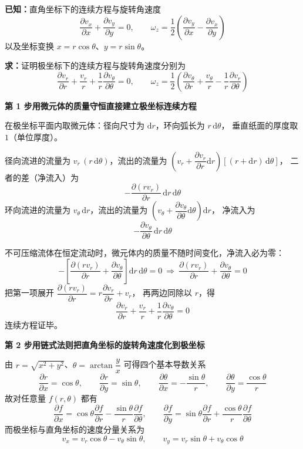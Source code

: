 \begin{jie}
\textbf{已知：}直角坐标下的连续方程与旋转角速度
\[ \frac{\partial v_x}{\partial x}+\frac{\partial v_y}{\partial y}=0,\qquad
   \omega_z=\frac{1}{2}\left(\frac{\partial v_y}{\partial x}-\frac{\partial v_x}{\partial y}\right) \]
以及坐标变换 $x=r\cos\theta$、$y=r\sin\theta$。

\textbf{求：}证明极坐标下的连续方程与旋转角速度分别为
\[ \frac{\partial v_r}{\partial r}+\frac{v_r}{r}+\frac{1}{r}\frac{\partial v_\theta}{\partial\theta}=0,\qquad
   \omega_z=\frac{1}{2}\left(\frac{\partial v_\theta}{\partial r}+\frac{v_\theta}{r}-\frac{1}{r}\frac{\partial v_r}{\partial\theta}\right) \]

\textbf{第 1 步\quad 用微元体的质量守恒直接建立极坐标连续方程}

在极坐标平面内取微元体：径向尺寸为 $\mathrm{d}r$，环向弧长为 $r\,\mathrm{d}\theta$，
垂直纸面的厚度取 $1$（单位厚度）。

径向流进的流量为 $v_r\,(r\,\mathrm{d}\theta)$，流出的流量为
$\left(v_r+\dfrac{\partial v_r}{\partial r}\mathrm{d}r\right)\left[(r+\mathrm{d}r)\,\mathrm{d}\theta\right]$，
二者的差（净流入）为
\[ -\frac{\partial(rv_r)}{\partial r}\,\mathrm{d}r\,\mathrm{d}\theta \]
环向流进的流量为 $v_\theta\,\mathrm{d}r$，流出的流量为
$\left(v_\theta+\dfrac{\partial v_\theta}{\partial\theta}\mathrm{d}\theta\right)\mathrm{d}r$，
净流入为
\[ -\frac{\partial v_\theta}{\partial\theta}\,\mathrm{d}r\,\mathrm{d}\theta \]

不可压缩流体在恒定流动时，微元体内的质量不随时间变化，净流入必为零：
\[ -\left[\frac{\partial(rv_r)}{\partial r}+\frac{\partial v_\theta}{\partial\theta}\right]\mathrm{d}r\,\mathrm{d}\theta=0
   \ \Longrightarrow\ \frac{\partial(rv_r)}{\partial r}+\frac{\partial v_\theta}{\partial\theta}=0 \]
把第一项展开 $\dfrac{\partial(rv_r)}{\partial r}=r\dfrac{\partial v_r}{\partial r}+v_r$，
再两边同除以 $r$，得
\[ \frac{\partial v_r}{\partial r}+\frac{v_r}{r}+\frac{1}{r}\frac{\partial v_\theta}{\partial\theta}=0 \]
连续方程证毕。

\textbf{第 2 步\quad 用链式法则把直角坐标的旋转角速度化到极坐标}

由 $r=\sqrt{x^2+y^2}$、$\theta=\arctan\dfrac{y}{x}$ 可得四个基本导数关系
\[ \frac{\partial r}{\partial x}=\cos\theta,\qquad \frac{\partial r}{\partial y}=\sin\theta,\qquad
   \frac{\partial\theta}{\partial x}=-\frac{\sin\theta}{r},\qquad \frac{\partial\theta}{\partial y}=\frac{\cos\theta}{r} \]
故对任意量 $f(r,\theta)$ 都有
\[ \frac{\partial f}{\partial x}=\cos\theta\frac{\partial f}{\partial r}-\frac{\sin\theta}{r}\frac{\partial f}{\partial\theta},\qquad
   \frac{\partial f}{\partial y}=\sin\theta\frac{\partial f}{\partial r}+\frac{\cos\theta}{r}\frac{\partial f}{\partial\theta} \]
而极坐标与直角坐标的速度分量关系为
\[ v_x=v_r\cos\theta-v_\theta\sin\theta,\qquad v_y=v_r\sin\theta+v_\theta\cos\theta \]


\end{jie}
